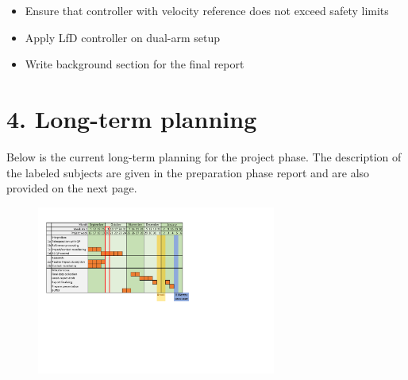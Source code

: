 \documentclass[11pt]{report}
\numberwithin{equation}{section}        %
\numberwithin{figure}{section}          %
\numberwithin{table}{section}           %
\begin{document}
  \begin{itemize}
      \item Ensure that controller with velocity reference does not exceed safety limits
      \item Apply LfD controller on dual-arm setup
      \item Write background section for the final report
  \end{itemize}

  \section*{4. Long-term planning}
  Below is the current long-term planning for the project phase. The description of the labeled subjects are given in the preparation phase report and are also provided on the next page.

  \begin{figure}[H]
  \centering
  \includegraphics[width=0.7\textwidth, trim={0.87cm 9.5cm 10cm 1.5cm},clip]{Graphics/planning v2.pdf}

  \label{fig:my_label}
  \end{figure}
\end{document}
